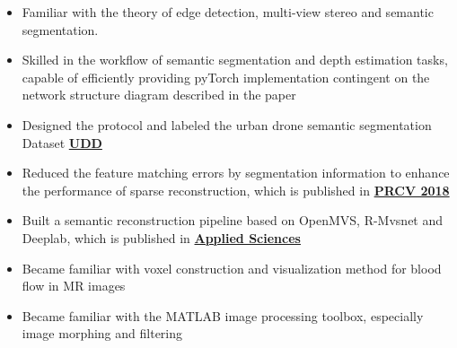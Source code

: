 \documentclass{resume}
\begin{document}
\begin{itemize}
    \item Familiar with the theory of edge detection, multi-view stereo and semantic segmentation.
    \item Skilled in the workflow of semantic segmentation and depth estimation tasks, capable of efficiently providing pyTorch implementation contingent on the network structure diagram described in the paper
	\item Designed the protocol and labeled the urban drone semantic segmentation Dataset \href{https://mrright.wang/UDD/}{\textbf{UDD}}
	\item Reduced the feature matching errors by segmentation information to enhance the performance of sparse reconstruction, which is published in \href{https://link.springer.com/content/pdf/10.1007\%2F978-3-030-03398-9_30.pdf}{\textbf{PRCV 2018}}
    \item Built a semantic reconstruction pipeline based on OpenMVS, R-Mvsnet and Deeplab, which is published in  \href{https://www.mdpi.com/2076-3417/10/4/1275/pdf}{\textbf{Applied Sciences}}

\end{itemize}


\begin{itemize}
  \item Became familiar with voxel construction and visualization method for blood flow in MR images
  \item Became familiar with the MATLAB image processing toolbox, especially image morphing and filtering
\end{itemize}


\end{document}
